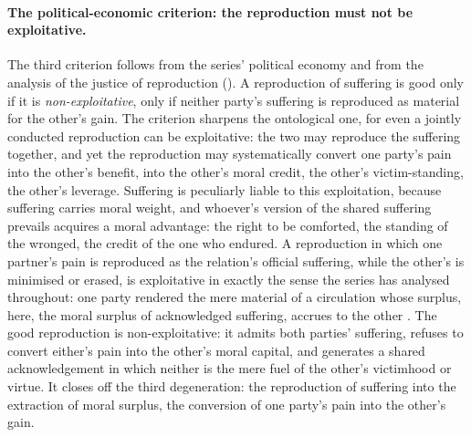 \paragraph{The political-economic criterion: the reproduction must not be exploitative.}
The third criterion follows from the series' political economy and from the analysis of the justice of reproduction (). A reproduction of suffering is good only if it is \emph{non-exploitative}, only if neither party's suffering is reproduced as material for the other's gain. The criterion sharpens the ontological one, for even a jointly conducted reproduction can be exploitative: the two may reproduce the suffering together, and yet the reproduction may systematically convert one party's pain into the other's benefit, into the other's moral credit, the other's victim-standing, the other's leverage. Suffering is peculiarly liable to this exploitation, because suffering carries moral weight, and whoever's version of the shared suffering prevails acquires a moral advantage: the right to be comforted, the standing of the wronged, the credit of the one who endured. A reproduction in which one partner's pain is reproduced as the relation's official suffering, while the other's is minimised or erased, is exploitative in exactly the sense the series has analysed throughout: one party rendered the mere material of a circulation whose surplus, here, the moral surplus of acknowledged suffering, accrues to the other \parencite{paperxv,paperxvii}. The good reproduction is non-exploitative: it admits both parties' suffering, refuses to convert either's pain into the other's moral capital, and generates a shared acknowledgement in which neither is the mere fuel of the other's victimhood or virtue. It closes off the third degeneration: the reproduction of suffering into the extraction of moral surplus, the conversion of one party's pain into the other's gain.

